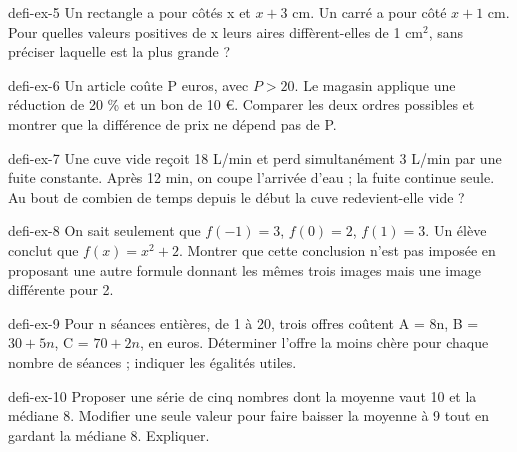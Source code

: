 \begin{blocEdition}{defi-ex-5}
Un rectangle a pour côtés x et $x+3$ cm. Un carré a pour côté $x+1$ cm. Pour quelles valeurs positives de x leurs aires diffèrent-elles de 1 cm$^2$, sans préciser laquelle est la plus grande ?
\end{blocEdition}
\begin{blocEdition}{defi-ex-6}
Un article coûte P euros, avec $P>20$. Le magasin applique une réduction de 20 \% et un bon de 10 €. Comparer les deux ordres possibles et montrer que la différence de prix ne dépend pas de P.
\end{blocEdition}
\begin{blocEdition}{defi-ex-7}
Une cuve vide reçoit 18 L/min et perd simultanément 3 L/min par une fuite constante. Après 12 min, on coupe l’arrivée d’eau ; la fuite continue seule. Au bout de combien de temps depuis le début la cuve redevient-elle vide ?
\end{blocEdition}
\begin{blocEdition}{defi-ex-8}
On sait seulement que $f(-1)=3$, $f(0)=2$, $f(1)=3$. Un élève conclut que $f(x)=x^2+2$. Montrer que cette conclusion n’est pas imposée en proposant une autre formule donnant les mêmes trois images mais une image différente pour 2.
\end{blocEdition}
\begin{blocEdition}{defi-ex-9}
Pour n séances entières, de 1 à 20, trois offres coûtent A = 8n, B = $30+5n$, C = $70+2n$, en euros. Déterminer l’offre la moins chère pour chaque nombre de séances ; indiquer les égalités utiles.
\end{blocEdition}
\begin{blocEdition}{defi-ex-10}
Proposer une série de cinq nombres dont la moyenne vaut 10 et la médiane 8. Modifier une seule valeur pour faire baisser la moyenne à 9 tout en gardant la médiane 8. Expliquer.
\end{blocEdition}
